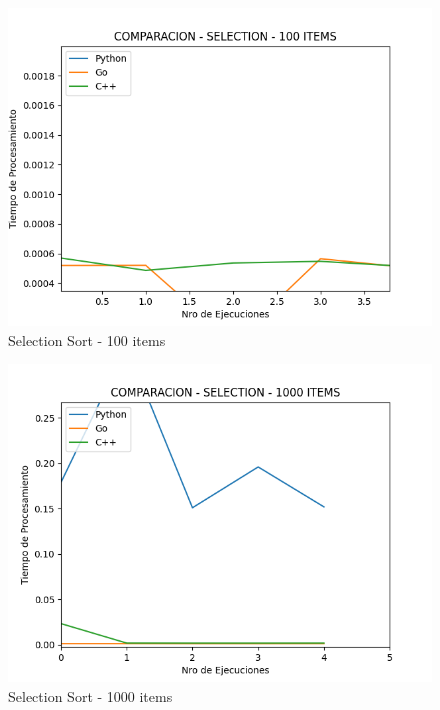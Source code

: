 \documentclass[12pt]{article} %
\begin{document}
\vspace{10cm}

\begin{figure}[H]
    \centering
    \includegraphics[width=\textwidth]{selection_100}
    \caption{Selection Sort - 100 items}
    \end{figure}
    
    \vspace{5mm}
    
    \begin{figure}[H]
    \centering
    \includegraphics[width=\textwidth]{selection_1000}
    \caption{Selection Sort - 1000 items}
    \end{figure}
    
\end{document}

